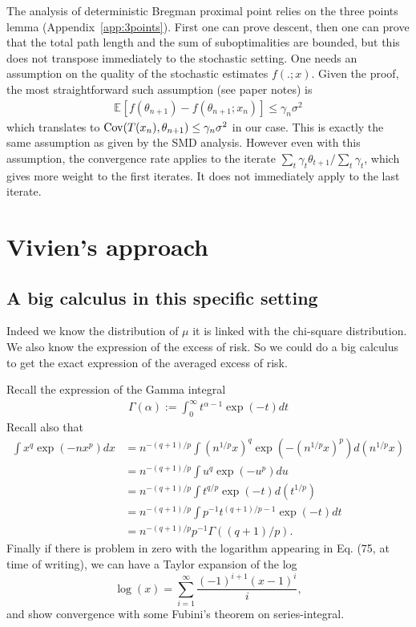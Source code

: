 \documentclass{article}
\newcommand*{\expect}[2][]{\ensuremath{\mathbb{E}_{#1} \left[ #2 \right] }} %
\newcommand{\natp}{\theta}
\newcommand{\lr}{\gamma} %
\begin{document}
The analysis of deterministic Bregman proximal point relies on the three points lemma (Appendix~\ref{app:3points}). First one can prove descent, then one can prove that the total path length and the sum of suboptimalities are bounded, but this does not transpose immediately to the stochastic setting. One needs an assumption on the quality of the stochastic estimates $f(. ; x)$. 
Given the proof, the most straightforward such assumption (see paper notes) is 
\begin{align}
\expect{f(\natp_{n+1}) - f(\natp_{n+1} ; x_{n})} \leq \gamma_n \sigma^2
\end{align}
which translates to $\Cov(T(x_{n}) , \natp_{n+1}) \leq  \gamma_n \sigma^2$ in our case. This is exactly the same assumption as given by the SMD analysis. However even with this assumption, the convergence rate applies to the iterate $\sum_t \lr_t \natp_{t+1} / \sum_t \lr_t$, which gives more weight to the first iterates. It does not immediately apply to the last iterate.


\section{Vivien's approach}
\subsection{A big calculus in this specific setting}

Indeed we know the distribution of $\mu$ it is linked with the chi-square distribution. We also know the expression of the excess of risk. So we could do a big calculus to get the exact expression of the averaged excess of risk.

Recall the expression of the Gamma integral
\begin{align}
  \Gamma(\alpha):=\int_0^\infty t^{\alpha-1} \exp(-t) d t
\end{align}
Recall also that
\begin{align}
    \int x^q \exp(-nx^p) dx
    &= n^{-(q+1)/p} \int (n^{1/p}x)^q \exp(-(n^{1/p}x)^p) d(n^{1/p}x)\\
    &= n^{-(q+1)/p} \int u^q \exp(-u^p) du\\
    &= n^{-(q+1)/p} \int t^{q/p} \exp(-t) d(t^{1/p})\\
    &= n^{-(q+1)/p} \int p^{-1} t^{(q+1)/p - 1} \exp(-t) dt\\
    &= n^{-(q+1)/p} p^{-1} \Gamma((q+1)/p).
\end{align}
Finally if there is problem in zero with the logarithm appearing in Eq. (75, at time of writing), we can have a Taylor expansion of the log 
\[
  \log(x) = \sum_{i=1}^\infty \frac{(-1)^{i+1}(x-1)^i}{i},
\]
and show convergence with some Fubini's theorem on series-integral.
\end{document}
